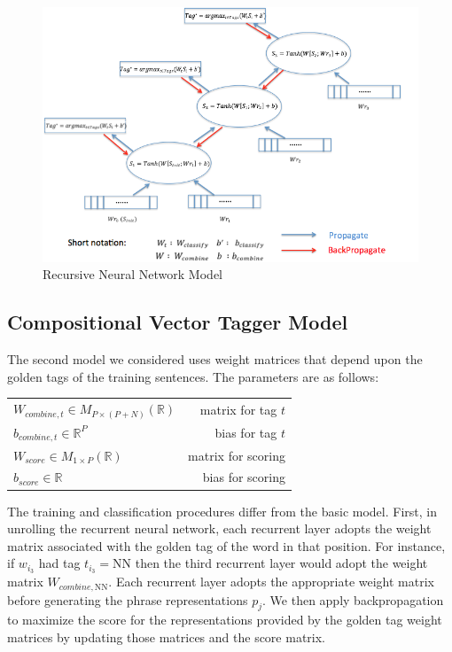 \documentclass[11pt]{article}
\begin{document}
\begin{figure}
	\includegraphics[scale=0.3]{model_figure.png}
	\caption{Recursive Neural Network Model}\label{Model_fig}
\end{figure}

\subsection{Compositional Vector Tagger Model}

The second model we considered uses weight matrices that depend upon the golden tags of the training sentences. The parameters are as follows:

\begin{center}
\begin{tabular}{ l r }
  $W_{combine,t}\in M_{P\times(P+N)}(\mathbb{R})$ & matrix for tag $t$ \\
  $b_{combine,t}\in \mathbb{R}^P$ & bias for tag $t$ \\
  $W_{score}\in M_{1\times P}(\mathbb{R})$ & matrix for scoring \\
  $b_{score}\in \mathbb{R}$ & bias for scoring \\
\end{tabular}
\end{center}

\vspace{5mm}
The training and classification procedures differ from the basic model. First, in unrolling the recurrent neural network, each recurrent layer adopts the weight matrix associated with the golden tag of the word in that position. For instance, if $w_{i_3}$ had tag $t_{i_3} = \text{NN}$ then the third recurrent layer would adopt the weight matrix $W_{combine,\text{NN}}$. Each recurrent layer adopts the appropriate weight matrix before generating the phrase representations $p_j$. We then apply backpropagation to maximize the score for the representations provided by the golden tag weight matrices by updating those matrices and the score matrix.
\end{document}
